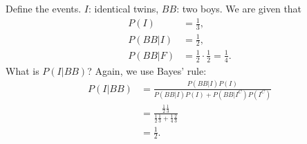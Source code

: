 

\setcounter{theorem}{1}
\begin{exercise}[BH.2.2]
\begin{solution}
	Define the events. $I$: identical twins, $BB$: two boys. We are given that
	\begin{align*}
		P(I) &= \frac{1}{3},\\
		P(BB|I) & = \frac{1}{2},\\
		P(BB|F)& = \frac{1}{2}\cdot\frac{1}{2} = \frac{1}{4}.
	\end{align*}
	What is $P(I|BB)$? Again, we use Bayes' rule:
	\begin{align*}
		P(I|BB)&= \frac{P(BB|I)P(I)}{P(BB|I)P(I) + P(BB|I^{C})P(I^C)}\\
		&=\frac{ \frac{1}{2}\frac{1}{3}}{\frac{1}{2}\frac{1}{3} + \frac{1}{4}\frac{2}{3}}\\
		& = \frac{1}{2}.
	\end{align*}
\end{solution}
\end{exercise}

